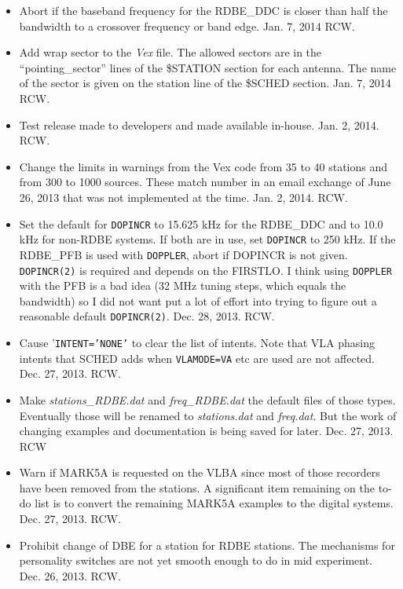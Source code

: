 \documentclass{report}
\begin{document}
\begin{itemize}
\item Abort if the baseband frequency for the RDBE\_DDC is closer than
half the bandwidth to a crossover frequency or band edge.  Jan. 7, 2014 RCW.

\item Add wrap sector to the {\sl Vex} file.  The allowed sectors are in the
``pointing\_sector'' lines of the \$STATION section for each antenna.  The
name of the sector is given on the station line of the \$SCHED section.
Jan. 7, 2014  RCW.

\item Test release made to developers and made available in-house.  Jan. 2,
2014.  RCW. 

\item Change the limits in warnings from the Vex code from 35 to 40 stations
and from 300 to 1000 sources.  These match number in an email exchange 
of June 26, 2013 that was not implemented at the time.  Jan. 2, 2014.  RCW.

\item Set the default for {\tt DOPINCR} to 15.625 kHz for the RDBE\_DDC and
to 10.0 kHz for non-RDBE systems.  If both are in use, set {\tt DOPINCR} to
250 kHz.  If the RDBE\_PFB is used with {\tt DOPPLER}, abort if DOPINCR
is not given.  {\tt DOPINCR(2)} is required and depends on the
FIRSTLO.  I think using {\tt DOPPLER} with the PFB is a bad idea (32 MHz
tuning steps, which equals the bandwidth) so I did not want put a lot of
effort into trying to figure out a reasonable default {\tt DOPINCR(2)}.
Dec. 28, 2013.  RCW.

\item Cause '{\tt INTENT='NONE'} to clear the list of intents.  Note that
VLA phasing intents that SCHED adds when {\tt VLAMODE=VA} etc are used are
not affected.  Dec. 27, 2013.  RCW.

\item Make {\sl stations\_RDBE.dat} and {\sl freq\_RDBE.dat} the default
files of those types.  Eventually those will be renamed to {\sl stations.dat}
and {\sl freq.dat}.  But the work of changing examples and documentation
is being saved for later.  Dec. 27, 2013.  RCW

\item Warn if MARK5A is requested on the VLBA since most of those
recorders have been removed from the stations.  A significant item
remaining on the to-do list is to convert the remaining MARK5A
examples to the digital systems.  Dec. 27, 2013.  RCW.

\item Prohibit change of DBE for a station for RDBE stations.  The
mechanisms for personality switches are not yet smooth enough to do
in mid experiment.  Dec. 26, 2013.  RCW.


\end{itemize}
\end{document}
